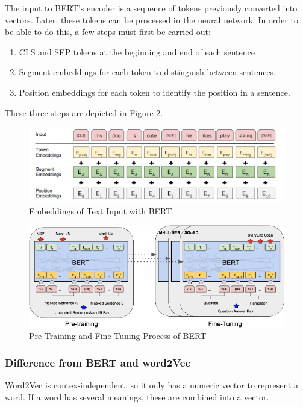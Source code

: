 The input to BERT's encoder is a sequence of tokens previously converted into vectors. Later, these tokens can be processed in the neural network. In order to be able to do this, a few steps must first be carried out:
\begin{enumerate}
	\item CLS and SEP tokens at the beginning and end of each sentence
	\item Segment embeddings for each token to distinguish between sentences.
	\item Position embeddings for each token to identify the position in a sentence.
\end{enumerate}
These three steps are depicted in Figure \ref{fig:bert_tokenizing}.

\begin{figure}[H]
	\centering
	\includegraphics[width=1\textwidth]{figures/bert_tokenizing.png}
	\caption{Embeddings of Text Input with BERT.}
	\label{fig:bert_tokenizing}
\end{figure}

\begin{figure}[H]
	\centering
	\includegraphics[width=1\textwidth]{figures/bert_training.png}
	\caption{Pre-Training and Fine-Tuning Process of BERT}
	\label{fig:bert_tokenizing}
\end{figure}

\subsubsection{Difference from BERT and word2Vec}
Word2Vec is contex-independent, so it only has a numeric vector to represent a word. If a word has several meanings, these are combined into a vector.

